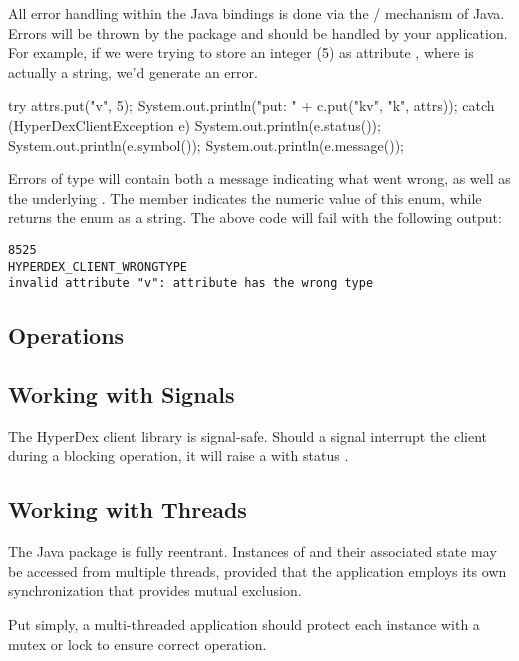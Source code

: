 All error handling within the Java bindings is done via the
/ mechanism of Java.  Errors will be thrown by the package
and should be handled by your application.  For example, if we were trying to
store an integer (5) as attribute , where  is actually a
string, we'd generate an error.

\begin{javacode}
try
{
    attrs.put("v", 5);
    System.out.println("put: " + c.put("kv", "k", attrs));
}
catch (HyperDexClientException e)
{
    System.out.println(e.status());
    System.out.println(e.symbol());
    System.out.println(e.message());
}
\end{javacode}

Errors of type  will contain both a message
indicating what went wrong, as well as the underlying .  The member  indicates the numeric
value of this enum, while  returns the enum as a string.  The above
code will fail with the following output:

\begin{verbatim}
8525
HYPERDEX_CLIENT_WRONGTYPE
invalid attribute "v": attribute has the wrong type
\end{verbatim}

\subsection{Operations}
\label{sec:api:java:ops}



\subsection{Working with Signals}
\label{sec:api:java:signals}

The HyperDex client library is signal-safe.  Should a signal interrupt the
client during a blocking operation, it will raise a
 with status .

\subsection{Working with Threads}
\label{sec:api:Java:threads}

The Java package is fully reentrant.  Instances of
 and their associated state may be accessed from
multiple threads, provided that the application employs its own synchronization
that provides mutual exclusion.

Put simply, a multi-threaded application should protect each 
instance with a mutex or lock to ensure correct operation.
